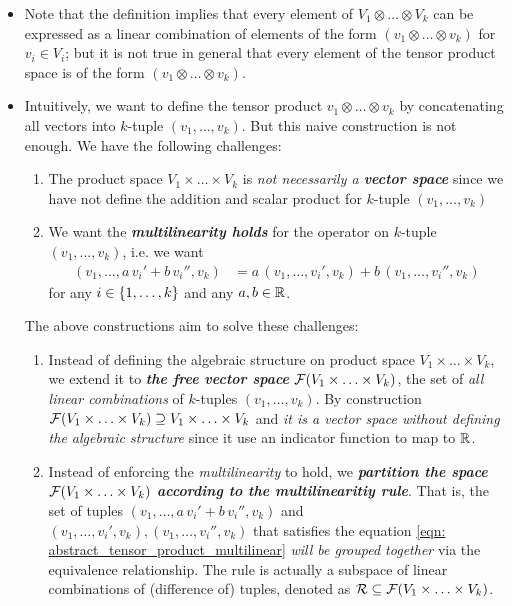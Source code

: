 \documentclass[11pt]{article}
\begin{document}
\begin{itemize}
\item \begin{remark}
Note that the definition implies that every element of  $V_1 \otimes \ldots \otimes V_k$ can be expressed as a linear combination of elements of the form $(v_1 \otimes \ldots \otimes v_k)$ for $v_i \in V_i$; but it is not true in general that every element of the tensor product space is of the form $(v_1 \otimes \ldots \otimes v_k)$.
\end{remark}

\item \begin{remark}
Intuitively, we want to define the tensor product $v_{1} \otimes \ldots \otimes v_{k}$ by concatenating all vectors into $k$-tuple $(v_{1}, \ldots, v_{k})$. But this naive construction is not enough. We have the following challenges:
\begin{enumerate}
\item The product space $V_1\times \ldots \times V_k$ is \emph{not necessarily a \textbf{vector space}} since we have not define the addition and scalar product for $k$-tuple $(v_{1}, \ldots, v_{k})$ 
\item We want the \emph{\textbf{multilinearity holds}} for the operator on $k$-tuple $(v_{1}, \ldots, v_{k})$, i.e. we want 
\begin{align}
(v_{1}, \ldots, a\,v_i' + b\,v_{i}'',  v_{k}) &= a\,(v_{1}, \ldots, v_i',  v_{k}) + b\,(v_{1}, \ldots, v_{i}'',  v_{k}) \label{eqn: abstract_tensor_product_multilinear}
\end{align} for any $i\in\left\{1,\ldots,k\right\}$ and any $a, b\in {\mathbb R}$.
\end{enumerate}
The above constructions aim to solve these challenges:
\begin{enumerate}
\item Instead of defining the algebraic structure on product space $V_1\times \ldots \times V_k$, we extend it to \emph{\textbf{the free vector space}} ${\mathcal F}(V_1\times \ldots \times V_k)$, the set of \emph{all linear combinations} of $k$-tuples $(v_{1}, \ldots, v_{k})$. By construction ${\mathcal F}(V_1\times \ldots \times V_k) \supseteq V_1\times \ldots \times V_k$ and \emph{it is a vector space without defining the algebraic structure} since it use an indicator function to map to ${\mathbb R}$.

\item Instead of enforcing the \emph{multilinearity} to hold,  we \emph{\textbf{partition the space}} ${\mathcal F}(V_1\times \ldots \times V_k)$ \emph{\textbf{according to the multilinearitiy rule}}. That is, the set of tuples $(v_{1}, \ldots, a\,v_i' + b\,v_{i}'',  v_{k})$ and $(v_{1}, \ldots, v_i',  v_{k}), (v_{1}, \ldots, v_{i}'',  v_{k})$ that satisfies the equation \eqref{eqn: abstract_tensor_product_multilinear} \emph{will be grouped together} via the equivalence relationship.  The rule is actually a subspace of linear combinations of (difference of) tuples, denoted as ${\mathcal R} \subseteq {\mathcal F}(V_1\times \ldots \times V_k)$.  


\end{enumerate}
\end{remark}
\end{itemize}
\end{document}
